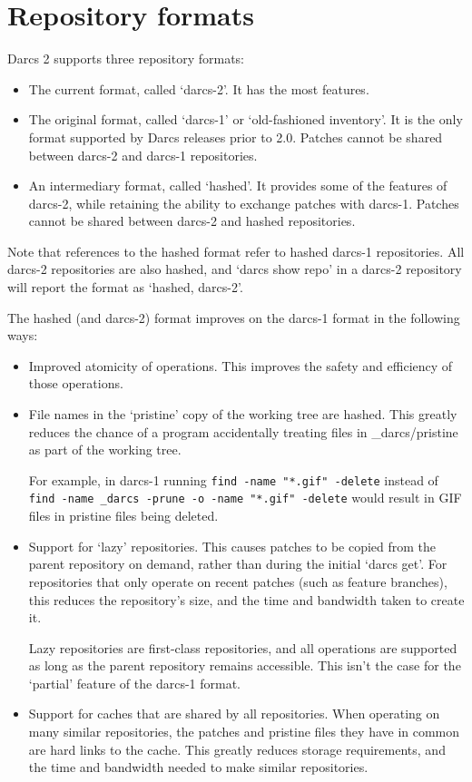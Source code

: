 \chapter{Repository formats}

Darcs 2 supports three repository formats:

\begin{itemize}
\item The current format, called `darcs-2'.  It has the most features.
\item The original format, called `darcs-1' or `old-fashioned inventory'.
  It is the only format supported by Darcs releases prior to 2.0.
  Patches cannot be shared between darcs-2 and darcs-1 repositories.
\item An intermediary format, called `hashed'.  It provides some of
  the features of darcs-2, while retaining the ability to exchange
  patches with darcs-1.  Patches cannot be shared between darcs-2 and
  hashed repositories.
\end{itemize}

Note that references to the hashed format refer to hashed darcs-1
repositories.  All darcs-2 repositories are also hashed, and `darcs
show repo' in a darcs-2 repository will report the format as `hashed,
darcs-2'.

The hashed (and darcs-2) format improves on the darcs-1 format in the
following ways:

\begin{itemize}
\item Improved atomicity of operations.  This improves the safety and
  efficiency of those operations.
\item File names in the `pristine' copy of the working tree are
  hashed.  This greatly reduces the chance of a program accidentally
  treating files in \_darcs/pristine as part of the working tree.

  For example, in darcs-1 running \verb|find -name "*.gif" -delete|
  instead of \verb|find -name _darcs -prune -o -name "*.gif" -delete|
  would result in GIF files in pristine files being deleted.

\item Support for `lazy' repositories.  This causes patches to be
  copied from the parent repository on demand, rather than during the
  initial `darcs get'.  For repositories that only operate on recent
  patches (such as feature branches), this reduces the repository's
  size, and the time and bandwidth taken to create it.

  Lazy repositories are first-class repositories, and all operations
  are supported as long as the parent repository remains accessible.
  This isn't the case for the `partial' feature of the darcs-1 format.

\item Support for caches that are shared by all repositories.  When
  operating on many similar repositories, the patches and pristine
  files they have in common are hard links to the cache.  This greatly
  reduces storage requirements, and the time and bandwidth needed to
  make similar repositories.
\end{itemize}

